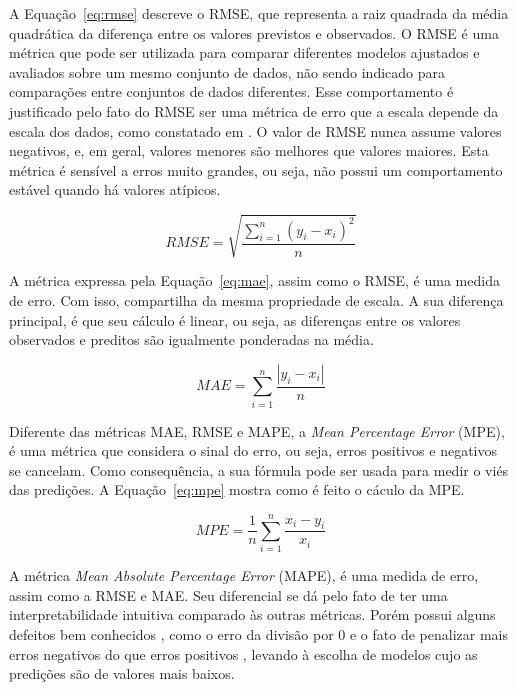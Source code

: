 A Equação~\ref{eq:rmse} descreve o RMSE, que representa a raiz quadrada da média quadrática da diferença entre os valores previstos e observados. O RMSE é uma métrica que pode ser utilizada para comparar diferentes modelos ajustados e avaliados sobre um mesmo conjunto de dados, não sendo indicado para comparações entre conjuntos de dados diferentes. Esse comportamento é justificado pelo fato do RMSE ser uma métrica de erro que a escala depende da escala dos dados, como constatado em \cite{HYNDMAN2006679}. O valor de RMSE nunca assume valores negativos, e, em geral, valores menores são melhores que valores maiores. Esta métrica é sensível a erros muito grandes, ou seja, não possui um comportamento estável quando há valores atípicos.

\begin{equation} \label{eq:rmse}
    RMSE=\sqrt{\dfrac{\sum ^{n}_{i=1}\left( y_{i}-x_{i}\right) ^{2}}{n}}
\end{equation}

A métrica expressa pela Equação~\ref{eq:mae}, assim como o RMSE, é uma medida de erro. Com isso, compartilha da mesma propriedade de escala. A sua diferença principal, é que seu cálculo é linear, ou seja, as diferenças entre os valores observados e preditos são igualmente ponderadas na média.

\begin{equation} \label{eq:mae}
    MAE=\sum ^{n}_{i=1}\dfrac{\left| y_{i}-x_{i}\right| }{n}
\end{equation}

Diferente das métricas MAE, RMSE e MAPE, a \textit{Mean Percentage Error} (MPE), é uma métrica que considera o sinal do erro, ou seja, erros positivos e negativos se cancelam. Como consequência, a sua fórmula pode ser usada para medir o viés das predições. A Equação~\ref{eq:mpe} mostra como é feito o cáculo da MPE.

\begin{equation} \label{eq:mpe}
    MPE=\dfrac{1}{n}\sum ^{n}_{i=1}\dfrac{x_{i}-y_{i}}{x_{i}}
\end{equation}

A métrica \textit{Mean Absolute Percentage Error} (MAPE), é uma medida de erro, assim como a RMSE e MAE. Seu diferencial se dá pelo fato de ter uma interpretabilidade intuitiva comparado às outras métricas. Porém possui alguns defeitos bem conhecidos \cite{CHRISTOFALLIS2015}, como o erro da divisão por 0 e o fato de penalizar mais erros negativos do que erros positivos \cite{MAKRIDAKIS1993527}, levando à escolha de modelos cujo as predições são de valores mais baixos.

